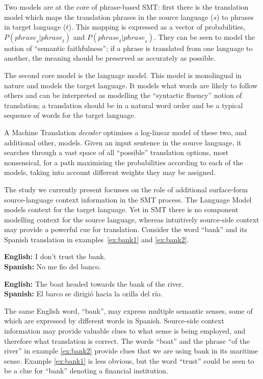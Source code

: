 \documentclass[smallextended]{svjour3}       %
\theoremstyle{break}
\begin{document}
Two models are at the core of phrase-based SMT: first there is the
translation model which maps the translation phrases in the source
language ($s$) to phrases in target language ($t$). This mapping is
expressed as a vector of probabilities, $P({phrase}_s|{phrase}_t)$ and
$P({phrase}_t|{phrase}_s)$. They can be seen to model the notion of
``semantic faithfulness''; if a phrase is translated from one language
to another, the meaning should be preserved as accurately as possible.

The second core model is the language model. This model is monolingual
in nature and models the target language. It models what words are
likely to follow others and can be interpreted as modelling the
``syntactic fluency'' notion of translation; a translation should be
in a natural word order and be a typical sequence of words for the
target language.

A Machine Translation \emph{decoder} optimises a log-linear model of
these two, and additional other, models. Given an input sentence in
the source language, it searches through a vast space of all
``possible'' translation options, most nonsensical, for a path
maximising the probabilities according to each of the models, taking
into account different weights they may be assigned.

The study we currently present focusses on the role of additional
surface-form source-language context
information in the SMT process. The Language Model models context
for the target language. Yet in SMT there is no component modelling
context for the source language, whereas intuitively source-side context may
provide a powerful cue for translation. Consider the word ``bank'' and its
Spanish translation in examples~\ref{ex:bank1} and \ref{ex:bank2}.

\begin{exe} %
\ex \textbf{English:} I don't trust the bank. \\
    \textbf{Spanish:} No me fio del banco.
\label{ex:bank1}

\ex \textbf{English:} The boat headed towards the bank of the river. \\
    \textbf{Spanish:} El barco se dirigió hacia la orilla del río.
\label{ex:bank2}
\end{exe}

The same English word, ``bank'', may express multiple semantic senses, some of
which are expressed by different words in Spanish. Source-side context
information may provide valuable clues to what sense is being employed, and
therefore what translation is correct.  The words ``boat'' and the phrase ``of
the river'' in example \ref{ex:bank2} provide clues that we are using
bank in its maritime sense. Example \ref{ex:bank1} is less obvious, but the
word ``trust'' could be seen to be a clue for ``bank'' denoting a
financial institution.
\end{document}
